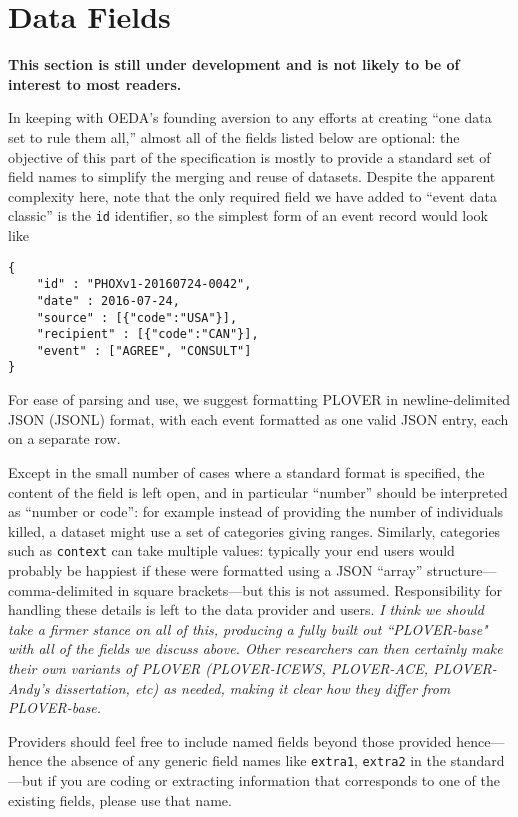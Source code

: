 \documentclass[11pt]{report}
\begin{document}
\chapter{Data Fields}

\textbf{This section is still under development and is not likely to be of interest to most readers.}

In keeping with OEDA's founding aversion to any efforts at creating ``one data set to rule them all,'' almost all of the fields listed below are optional: the objective of this part of the specification is mostly to provide a standard set of field names to simplify the merging and reuse of datasets. Despite the apparent complexity here, note that the only required field we have added to ``event data classic'' is the \texttt{id} identifier, so the simplest form of an event record would look like
\begin{verbatim}
{
	"id" : "PHOXv1-20160724-0042",
	"date" : 2016-07-24,
	"source" : [{"code":"USA"}],
	"recipient" : [{"code":"CAN"}],
	"event" : ["AGREE", "CONSULT"]
}
\end{verbatim}

\noindent For ease of parsing and use, we suggest formatting PLOVER in newline-delimited JSON (JSONL) format, with each event formatted as one valid JSON entry, each on a separate row.

Except in the small number of cases where a standard format is specified, the content of the field is left open, and in particular ``number'' should be interpreted as ``number or code'': for example instead of providing the number of individuals killed, a dataset might use a set of categories giving ranges. Similarly, categories such as \texttt{context} can take multiple values: typically your end users would probably be happiest if these were formatted using a JSON ``array'' structure---comma-delimited in square brackets---but this is not assumed. Responsibility for handling these details is left to the data provider and users. \emph{I think we should take a firmer stance on all of this, producing a fully built out ``PLOVER-base" with all of the fields we discuss above. Other researchers can then certainly make their own variants of PLOVER (PLOVER-ICEWS, PLOVER-ACE, PLOVER-Andy's dissertation, etc) as needed, making it clear how they differ from PLOVER-base.}

Providers should feel free to include named fields beyond those provided hence---hence the absence of any generic field names like \texttt{extra1}, \texttt{extra2} in the standard---but if you are coding or extracting information that corresponds to one of the existing fields, please use that name.
\end{document}
